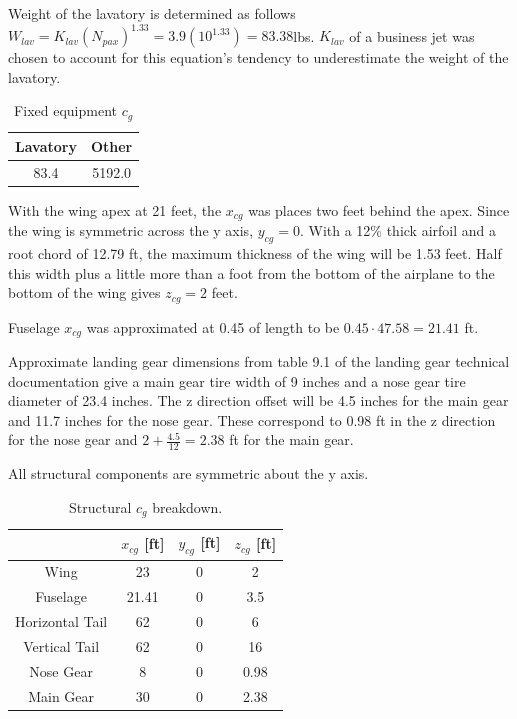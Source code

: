 \documentclass[conf]{new-aiaa}
\begin{document}
Weight of the lavatory is determined as follows $W_{lav} = K_{lav}(N_{pax})^1.33=3.9(10^{1.33})=83.38$lbs\cite{pres19}. $K_{lav}$ of a business jet was chosen to account for this equation's tendency to underestimate the weight of the lavatory.

\begin{table}[H]
\centering
\label{tab:Fixed Equipment Weight}
\caption{Fixed equipment $c_g$}
\begin{tabular}{|c|c|}\hline
Lavatory & Other \\ \hline
83.4 & 5192.0 \\ \hline
\end{tabular}
\end{table}

With the wing apex at 21 feet, the $x_{cg}$ was places two feet behind the apex. Since the wing is symmetric across the y axis, $y_{cg}=0$. With a 12\% thick airfoil and a root chord of 12.79 ft, the maximum thickness of the wing will be 1.53 feet. Half this width plus a little more than a foot from the bottom of the airplane to the bottom of the wing gives $z_{cg}=2$ feet.

Fuselage $x_{cg}$ was approximated at 0.45 of length\cite{pres19} to be $0.45\cdot47.58=21.41$ ft.

Approximate landing gear dimensions from table 9.1 of the landing gear technical documentation\citet{orange_book} give a main gear tire width of 9 inches and a nose gear tire diameter of 23.4 inches. The z direction offset will be 4.5 inches for the main gear and 11.7 inches for the nose gear. These correspond to 0.98 ft in the z direction for the nose gear and $2+\frac{4.5}{12}=2.38$ ft for the main gear.

All structural components are symmetric about the y axis.
\begin{table}[H]
\centering
\label{tab:Structural cg}
\caption{Structural $c_g$ breakdown.}
\begin{tabular}{|c|c|c|c|}\hline
	& $x_{cg}$ [ft] & $y_{cg}$ [ft] & $z_{cg}$ [ft] \\ \hline
Wing & 23 & 0 & 2\\ \hline
Fuselage & 21.41 & 0 & 3.5\\ \hline
Horizontal Tail & 62 & 0 & 6\\ \hline
Vertical Tail & 62	& 0 & 16\\ \hline
Nose Gear & 8 & 0 & 0.98\\ \hline
Main Gear & 30 & 0 & 2.38\\ \hline 
\end{tabular}
\end{table}
\end{document}
